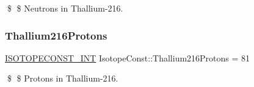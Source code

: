 \$ \$ Neutrons in Thallium-\/216. \mbox{\label{group___isotope_const-_thallium-_tl216_gaacb0c62847482e32fbd44eadbe0bbf44}} 
\subsubsection{\texorpdfstring{Thallium216\+Protons}{Thallium216Protons}}
{\footnotesize\ttfamily \mbox{\hyperlink{group___isotope_const-_macros_ga5f18360b3e99483a35c32d789e62621c}{I\+S\+O\+T\+O\+P\+E\+C\+O\+N\+S\+T\+\_\+\+I\+NT}} Isotope\+Const\+::\+Thallium216\+Protons = 81}

\$ \$ Protons in Thallium-\/216. 